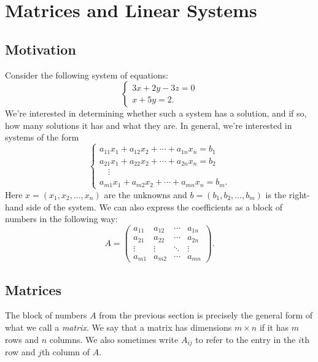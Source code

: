 \chapter{Matrices and Linear Systems}

\section{Motivation}
Consider the following system of equations:
\[
  \begin{cases}
    3x + 2y - 3z = 0 \\
    x + 5y = 2.
  \end{cases}
\]
We're interested in determining whether such a system
has a solution, and if so, how many solutions it has
and what they are. In general, we're interested in
systems of the form
\[
  \begin{cases}
    a_{11} x_1 + a_{12}x_2 + \cdots + a_{1n}x_n = b_1 \\
    a_{21} x_1 + a_{22}x_2 + \cdots + a_{2n}x_n = b_2 \\
    \quad \vdots \\
    a_{m1} x_1 + a_{m2}x_2 + \cdots + a_{mn}x_n = b_m.
  \end{cases}
\]
Here $x = (x_1, x_2, \dots, x_n)$ are the unknowns
and $b = (b_1, b_2, \dots, b_m)$ is the right-hand side
of the system. We can also express the coefficients
as a block of numbers in the following way:
\[
  A = \begin{pmatrix}
    a_{11} & a_{12} & \cdots & a_{1n} \\
    a_{21} & a_{22} & \cdots & a_{2n} \\
    \vdots & \vdots & \ddots & \vdots \\
    a_{m 1} & a_{m 2} & \cdots & a_{m n}
  \end{pmatrix}.
\]

\section{Matrices}
The block of numbers $A$ from the previous section
is precisely the general form of
what we call a \emph{matrix}.
We say that a matrix has dimensions
$m \times n$ if it has $m$ rows and $n$ columns.
We also sometimes write $A_{ij}$ to refer to
the entry in the $i$th row and $j$th column of $A$.

